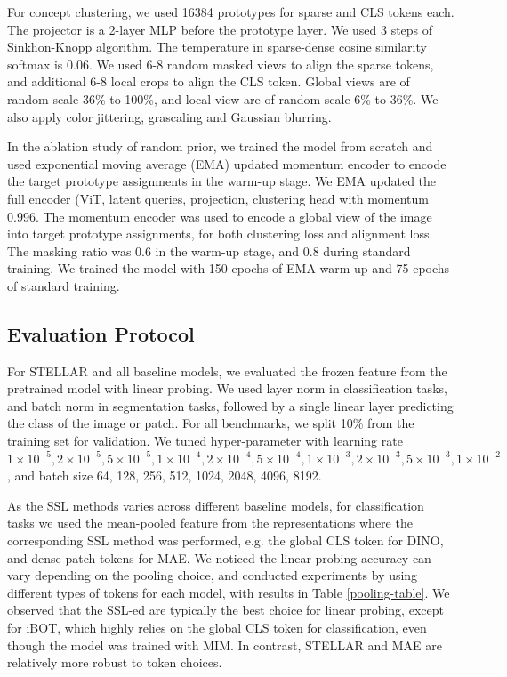 For concept clustering, we used 16384 prototypes for sparse and CLS tokens each. The projector is a 2-layer MLP before the prototype layer. We used 3 steps of Sinkhon-Knopp algorithm. The temperature in sparse-dense cosine similarity softmax is 0.06. We used 6-8 random masked views to align the sparse tokens, and additional 6-8 local crops to align the CLS token. Global views are of random scale 36\% to 100\%, and local view are of random scale 6\% to 36\%. We also apply color jittering, grascaling and Gaussian blurring.

In the ablation study of random prior, we trained the model from scratch and used exponential moving average (EMA) updated momentum encoder to encode the target prototype assignments in the warm-up stage. We EMA updated the full encoder (ViT, latent queries, projection, clustering head with momentum 0.996. The momentum encoder was used to encode a global view of the image into target prototype assignments, for both clustering loss and alignment loss. The masking ratio was 0.6 in the warm-up stage, and 0.8 during standard training. We trained the model with 150 epochs of EMA warm-up and 75 epochs of standard training.

\subsection{Evaluation Protocol}\label{eval}
For STELLAR and all baseline models, we evaluated the frozen feature from the pretrained model with linear probing. We used layer norm in classification tasks, and batch norm in segmentation tasks, followed by a single linear layer predicting the class of the image or patch. For all benchmarks, we split 10\% from the training set for validation. We tuned hyper-parameter with learning rate $1\times 10^{-5}, 2\times 10^{-5}, 5\times 10^{-5}, 1\times 10^{-4}, 2\times 10^{-4}, 5\times 10^{-4}, 1\times 10^{-3}, 2\times 10^{-3}, 5\times 10^{-3}, 1\times 10^{-2}$, and batch size 64, 128, 256, 512, 1024, 2048, 4096, 8192.

As the SSL methods varies across different baseline models, for classification tasks we used the mean-pooled feature from the representations where the corresponding SSL method was performed, e.g. the global CLS token for DINO, and dense patch tokens for MAE. We noticed the linear probing accuracy can vary depending on the pooling choice, and conducted experiments by using different types of tokens for each model, with results in Table \ref{pooling-table}. We observed that the SSL-ed are typically the best choice for linear probing, except for iBOT, which highly relies on the global CLS token for classification, even though the model was trained with MIM. In contrast, STELLAR and MAE are relatively more robust to token choices.


